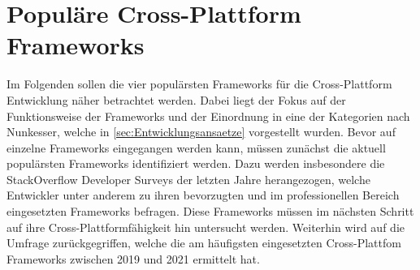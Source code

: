 \chapter{Populäre Cross-Plattform Frameworks}
\label{ch:Frameworks}

Im Folgenden sollen die vier populärsten Frameworks für die Cross-Plattform Entwicklung näher betrachtet werden.
Dabei liegt der Fokus auf der Funktionsweise der Frameworks und der Einordnung in eine der Kategorien nach Nunkesser, welche in \autoref{sec:Entwicklungsansaetze} vorgestellt wurden.
Bevor auf einzelne Frameworks eingegangen werden kann, müssen zunächst die aktuell populärsten Frameworks identifiziert werden.
Dazu werden insbesondere die StackOverflow Developer Surveys \cite{Stackoverflow_2020} \cite{Stackoverflow_2021} \cite{Stackoverflow_2022} der letzten Jahre herangezogen, welche Entwickler unter anderem zu ihren bevorzugten und im professionellen Bereich eingesetzten Frameworks befragen.
Diese Frameworks müssen im nächsten Schritt auf ihre Cross-Plattformfähigkeit hin untersucht werden.
Weiterhin wird auf die Umfrage \cite{Statista_UsedCrossPlatformFrameworks} zurückgegriffen, welche die am häufigsten eingesetzten Cross-Plattfom Frameworks zwischen 2019 und 2021 ermittelt hat.



